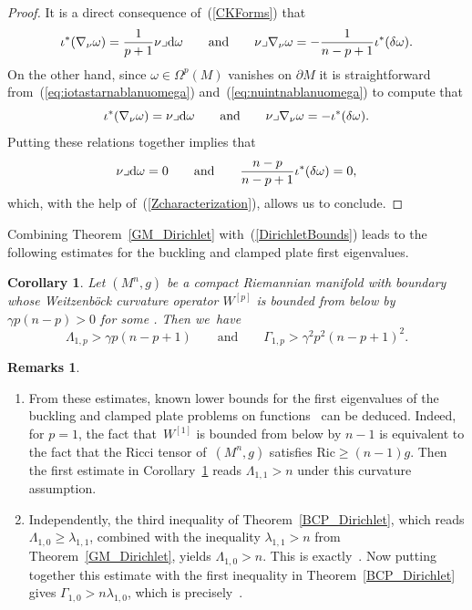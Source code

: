 \documentclass[10pt,a4paper]{amsart}
\numberwithin{equation}{section}
\newtheorem{Corollary}[Theorem]{Corollary}
\theoremstyle{definition}
\newtheorem{Remarks}[Theorem]{Remarks}
\begin{document}
\begin{proof} It is a direct consequence of~(\ref{CKForms}) that
\[
\iota^*(\nabla_\nu\omega)=\frac{1}{p+1}\nu\lrcorner {\rm d}\omega\qquad\text{and}\qquad\nu\lrcorner\nabla_\nu\omega=-\frac{1}{n-p+1}\iota^*(\delta\omega).
\]
On the other hand, since $\omega\in\Omega^p(M)$ vanishes on $\partial M$ it is straightforward from~(\ref{eq:iotastarnablanuomega}) and~(\ref{eq:nuintnablanuomega}) to compute that
\[
\iota^*(\nabla_\nu\omega)=\nu\lrcorner {\rm d}\omega\qquad\text{and}\qquad\nu\lrcorner\nabla_\nu\omega=-\iota^*(\delta\omega).
\]
Putting these relations together implies that
\[
\nu\lrcorner {\rm d}\omega=0 \qquad\text{and}\qquad\frac{n-p}{n-p+1}\iota^*(\delta\omega)=0,
\]
which, with the help of~(\ref{Zcharacterization}), allows us to conclude.
\end{proof}

Combining Theorem~\ref{GM_Dirichlet} with~(\ref{DirichletBounds}) leads to the following estimates for the buckling and clamped plate first eigenvalues.

\begin{Corollary}\label{BCDL}
Let $(M^n,g)$ be a compact Riemannian manifold with boundary whose Weitzen\-b\"ock curvature operator $W^{[p]}$ is bounded from below by $\gamma p(n-p)>0$ for some .
Then we~have
\[
\Lambda_{1,p}>\gamma p(n-p+1)\qquad\text{and}\qquad\Gamma_{1,p}>\gamma^2 p^2(n-p+1)^2.
\]
\end{Corollary}

\begin{Remarks}%
\noindent\begin{enumerate}\itemsep=0pt
\item From these estimates, known lower bounds for the first eigenvalues of the buckling and clamped plate problems on functions~\cite{ChenChengWangXia2012} can be deduced.
Indeed, for $p=1$, the fact that~$W^{[1]}$ is bounded from below by $n-1$ is equivalent to the fact that the Ricci tensor of~$(M^n,g)$ satisfies $\mathrm{Ric}\geq (n-1)g$.
Then the first estimate in Corollary~\ref{BCDL} reads $\Lambda_{1,1}>n$ under this curvature assumption.
\item Independently, the third inequality of Theorem~\ref{BCP_Dirichlet}, which reads $\Lambda_{1,0}\geq \lambda_{1,1}$, combined with the inequality $\lambda_{1,1}>n$ from Theorem~\ref{GM_Dirichlet}, yields $\Lambda_{1,0}>n$.
This is exactly~\cite[Theorem~1.6]{ChenChengWangXia2012}.
Now putting together this estimate with the first inequality in Theorem~\ref{BCP_Dirichlet} gives $\Gamma_{1,0}>n\lambda_{1,0}$, which is precisely~\cite[Theorem 1.5]{ChenChengWangXia2012}.
\end{enumerate}
\end{Remarks}
\end{document}
